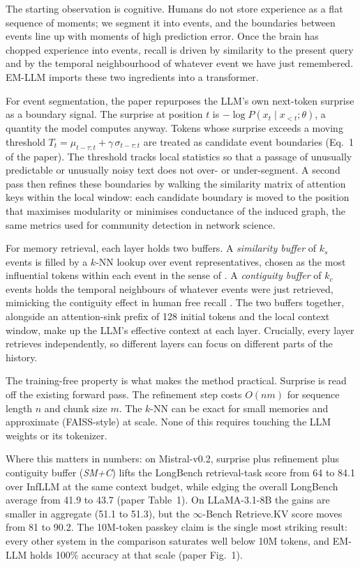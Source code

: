 The starting observation is cognitive. Humans do not store experience as a flat sequence of moments; we segment it into events, and the boundaries between events line up with moments of high prediction error. Once the brain has chopped experience into events, recall is driven by similarity to the present query and by the temporal neighbourhood of whatever event we have just remembered. EM-LLM imports these two ingredients into a transformer.

For event segmentation, the paper repurposes the LLM's own next-token surprise as a boundary signal. The surprise at position $t$ is $-\log P(x_t \mid x_{<t}; \theta)$, a quantity the model computes anyway. Tokens whose surprise exceeds a moving threshold $T_t = \mu_{t-\tau:t} + \gamma \, \sigma_{t-\tau:t}$ are treated as candidate event boundaries (Eq.\ 1 of the paper). The threshold tracks local statistics so that a passage of unusually predictable or unusually noisy text does not over- or under-segment. A second pass then refines these boundaries by walking the similarity matrix of attention keys within the local window: each candidate boundary is moved to the position that maximises modularity or minimises conductance of the induced graph, the same metrics used for community detection in network science.

For memory retrieval, each layer holds two buffers. A \emph{similarity buffer} of $k_s$ events is filled by a $k$-NN lookup over event representatives, chosen as the most influential tokens within each event in the sense of \textcite{xiao2024infllm}. A \emph{contiguity buffer} of $k_c$ events holds the temporal neighbours of whatever events were just retrieved, mimicking the contiguity effect in human free recall \cite{howard2002contiguity}. The two buffers together, alongside an attention-sink prefix of 128 initial tokens \cite{xiao2024attsinks} and the local context window, make up the LLM's effective context at each layer. Crucially, every layer retrieves independently, so different layers can focus on different parts of the history.

The training-free property is what makes the method practical. Surprise is read off the existing forward pass. The refinement step costs $O(nm)$ for sequence length $n$ and chunk size $m$. The $k$-NN can be exact for small memories and approximate (FAISS-style) at scale. None of this requires touching the LLM weights or its tokenizer.

Where this matters in numbers: on Mistral-v0.2, surprise plus refinement plus contiguity buffer (\emph{SM+C}) lifts the LongBench retrieval-task score from 64 to 84.1 over InfLLM at the same context budget, while edging the overall LongBench average from 41.9 to 43.7 (paper Table~1). On LLaMA-3.1-8B the gains are smaller in aggregate (51.1 to 51.3), but the $\infty$-Bench Retrieve.KV score moves from 81 to 90.2. The 10M-token passkey claim is the single most striking result: every other system in the comparison saturates well below 10M tokens, and EM-LLM holds 100\% accuracy at that scale (paper Fig.~1).

